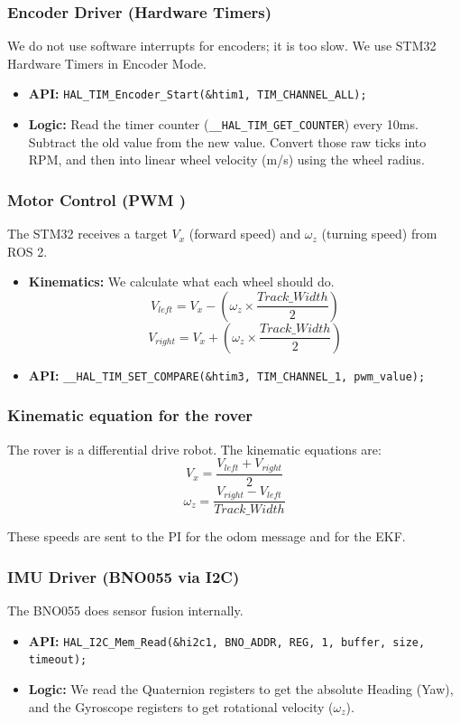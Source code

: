 \documentclass[12pt, a4paper]{article}
\begin{document}
\subsubsection{Encoder Driver (Hardware Timers)}
We do not use software interrupts for encoders; it is too slow. We use STM32 Hardware Timers in Encoder Mode.
\begin{itemize}
    \item \textbf{API:} \texttt{HAL\_TIM\_Encoder\_Start(\&htim1, TIM\_CHANNEL\_ALL);}
    \item \textbf{Logic:} Read the timer counter (\texttt{\_\_HAL\_TIM\_GET\_COUNTER}) every 10ms. Subtract the old value from the new value. Convert those raw ticks into RPM, and then into linear wheel velocity (m/s) using the wheel radius.
\end{itemize}

\subsubsection{Motor Control (PWM )}
The STM32 receives a target $V_x$ (forward speed) and $\omega_z$ (turning speed) from ROS 2.
\begin{itemize}
    \item \textbf{Kinematics:} We calculate what each wheel should do.
    $$ V_{left} = V_x - (\omega_z \times \frac{Track\_Width}{2}) $$
    $$ V_{right} = V_x + (\omega_z \times \frac{Track\_Width}{2}) $$
    \item \textbf{API:} \texttt{\_\_HAL\_TIM\_SET\_COMPARE(\&htim3, TIM\_CHANNEL\_1, pwm\_value);}
\end{itemize}

\subsubsection{Kinematic equation for the rover}
The rover is a differential drive robot. The kinematic equations are:
$$ V_x = \frac{V_{left} + V_{right}}{2} $$
$$ \omega_z = \frac{V_{right} - V_{left}}{Track\_Width} $$

These speeds are sent to the PI for the odom message and for the EKF.

\subsubsection{IMU Driver (BNO055 via I2C)}
The BNO055 does sensor fusion internally.
\begin{itemize}
    \item \textbf{API:} \texttt{HAL\_I2C\_Mem\_Read(\&hi2c1, BNO\_ADDR, REG, 1, buffer, size, timeout);}
    \item \textbf{Logic:} We read the Quaternion registers to get the absolute Heading (Yaw), and the Gyroscope registers to get rotational velocity ($\omega_z$).
\end{itemize}
\end{document}
